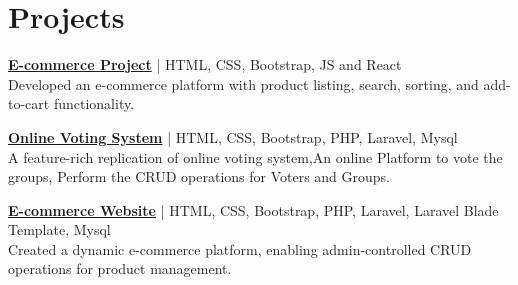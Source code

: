 \documentclass[a4paper,10pt]{article}
\begin{document}
\section*{Projects}
\textbf{\href{https://bhimassignment.netlify.app/}{E-commerce Project}} | HTML, CSS, Bootstrap, JS and React \\  
Developed an e-commerce platform with product listing, search, sorting, and add-to-cart functionality.

\noindent\textbf{\href{https://github.com/bhimpd/Online-Voting-System}{Online Voting System}} | HTML, CSS, Bootstrap, PHP, Laravel, Mysql \\  
A feature-rich replication of online voting system,An online Platform to vote the groups, Perform the CRUD operations for Voters and Groups.

\noindent\textbf{\href{https://github.com/bhimpd/laravel_2ndecommerce}{E-commerce Website}} | HTML, CSS, Bootstrap, PHP, Laravel, Laravel Blade Template,  Mysql \\  
Created a dynamic e-commerce platform, enabling admin-controlled CRUD operations for product management.

\end{document}
